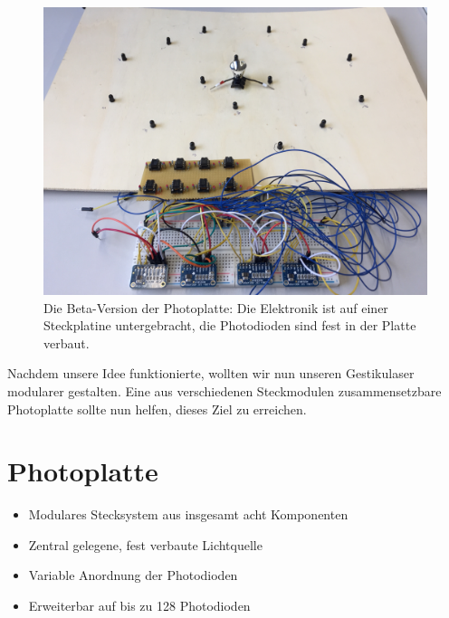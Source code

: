 \documentclass{sciposter}
\begin{document}
\begin{multicols}{3}
\begin{figure}[h]
	\centering
	\includegraphics[scale=0.175]{../figures/PhotoplatteBeta.jpeg}
	\caption{Die Beta-Version der Photoplatte: Die Elektronik ist auf einer Steckplatine untergebracht, die Photodioden sind fest in der Platte verbaut.}
	\label{fig:PhotoplatteBeta}
\end{figure}

\noindent
Nachdem unsere Idee funktionierte, wollten wir nun unseren Gestikulaser modularer gestalten. Eine aus verschiedenen Steckmodulen zusammensetzbare Photoplatte sollte nun helfen, dieses Ziel zu erreichen.


\section{Photoplatte}

\begin{itemize}
	\item Modulares Stecksystem aus insgesamt acht Komponenten
	\item Zentral gelegene, fest verbaute Lichtquelle
	\item Variable Anordnung der Photodioden
	\item Erweiterbar auf bis zu 128 Photodioden
\end{itemize}


\end{multicols}
\end{document}
